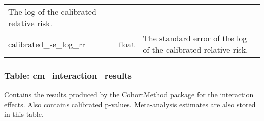 \documentclass[
]{article}
\begin{document}
\begin{longtable}[]{@{}lll@{}}
\begin{minipage}[t]{0.50\columnwidth}
The log of the calibrated relative risk.\strut
\end{minipage}\tabularnewline
\begin{minipage}[t]{0.23\columnwidth}\raggedright
calibrated\_se\_log\_rr\strut
\end{minipage} & \begin{minipage}[t]{0.18\columnwidth}\raggedright
float\strut
\end{minipage} & \begin{minipage}[t]{0.50\columnwidth}\raggedright
The standard error of the log of the calibrated relative risk.\strut
\end{minipage}\tabularnewline
\bottomrule
\end{longtable}

\hypertarget{table-cm_interaction_results}{%
\subsubsection{Table:
cm\_interaction\_results}\label{table-cm_interaction_results}}

Contains the results produced by the CohortMethod package for the
interaction effects. Also contains calibrated p-values. Meta-analysis
estimates are also stored in this table.
\end{document}
